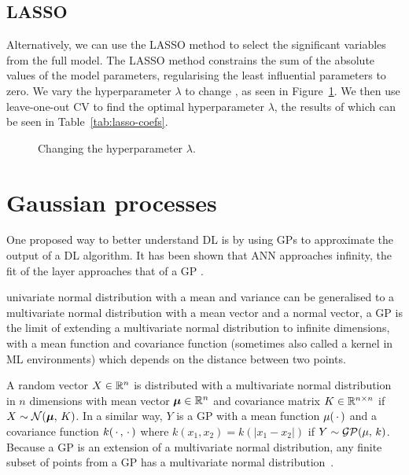 \subsection{\acl{LASSO}}

Alternatively, we can use the \ac{LASSO} method to select the significant variables from the full model.
The \ac{LASSO} method constrains the sum of the absolute values of the model parameters, regularising the least influential parameters to zero.
We vary the hyperparameter \(\lambda\) to change , as seen in Figure~\ref{fig:lasso-lambda}.
We then use leave-one-out \ac{CV} to find the optimal hyperparameter \(\lambda\), the results of which can be seen in Table~\ref{tab:lasso-coefs}.

\begin{figure}[htbp]
	\centering
	
	\caption{Changing the hyperparameter \(\lambda\).}
	\label{fig:lasso-lambda}
\end{figure}


\section{Gaussian processes}

One proposed way to better understand \ac{DL} is by using \acp{GP} to approximate the output of a \ac{DL} algorithm.
It has been shown that  \ac{ANN} approaches infinity, the fit of the layer approaches that of a \ac{GP} .

 univariate normal distribution with a mean and variance can be generalised to a multivariate normal distribution with a mean vector and a normal vector, a \ac{GP} is the limit of extending a multivariate normal distribution to infinite dimensions, with a mean function and covariance function (sometimes also called a kernel in \ac{ML} environments) which depends on the distance between two points.

A random vector \(X \in \mathbb{R}{}^n\) is distributed with a multivariate normal distribution in \(n\) dimensions with mean vector \(\bm{\mu} \in \mathbb{R}{}^n\) and covariance matrix \(K \in \mathbb{R}^{n \times n}\) if \(X \sim \mathcal{N}(\bm{\mu},\, K)\).
In a similar way, \(Y\) is a \ac{GP} with a mean function \(\mu(\,\cdot\,)\) and a covariance function \(k(\,\cdot\,{}, \,\cdot\,{})\) where \(k(x_1, x_2) = k(\left|x_1-x_2\right|)\) if \(Y \sim \mathcal{GP}(\mu,\, k)\).
Because a \ac{GP} is an extension of a multivariate normal distribution, any finite subset of points from a \ac{GP} has a multivariate normal distribution~\autocite[515]{williams1996}.

